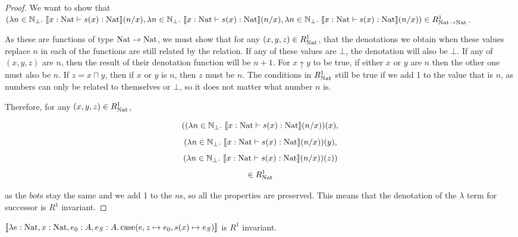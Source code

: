\begin{proof} 
We want to show 
 that  $(\lambda n \in \mathbb{N}_{\bot}. \ \llbracket x : \operatorname{Nat} \vdash s(x) : \operatorname{Nat} \rrbracket (n/x),\lambda n \in \mathbb{N}_{\bot}. \ \llbracket x : \operatorname{Nat} \vdash s(x) : \operatorname{Nat} \rrbracket (n/x), \lambda n \in \mathbb{N}_{\bot}. \ \llbracket x : \operatorname{Nat} \vdash s(x) : \operatorname{Nat} \rrbracket (n/x)) \in R_{\operatorname{Nat} \to \operatorname{Nat}}^1$. 
 
As these are functions of type $\operatorname{Nat} \to \operatorname{Nat}$, we must show that for any $(x,y,z) \in R_{\operatorname{Nat}}^1$, that the denotations we obtain when these values replace $n$ in each of the functions are still related by the relation. If any of these values are $\bot$, the denotation will also be $\bot$. If any of $(x,y,z)$ are $n$, then the result of their denotation function will be $n+1$. For $x \uparrow y$ to be true, if either $x$ or $y$ are $n$ then the other one must also be $n$. If $z = x \sqcap y$, then if $x$ or $y$ is $n$, then $z$ must be $n$. The conditions in $R_{\operatorname{Nat}}^1$ still be true if we add 1 to the value that is $n$, as  numbers can only be related to themselves or $\bot$, so it does not matter what number $n$ is.

Therefore, for any $(x,y,z) \in R_{\operatorname{Nat}}^1$,

 \[((\lambda n \in \mathbb{N}_{\bot}. \ \llbracket x : \nat \vdash s(x) : \nat \rrbracket (n/x)) (x),\]
 \[(\lambda n \in \mathbb{N}_{\bot}. \ \llbracket x : \nat \vdash s(x) : \nat \rrbracket (n/x)) (y), \]
 \[(\lambda n \in \mathbb{N}_{\bot}. \ \llbracket x : \nat \vdash s(x) : \nat \rrbracket (n/x))(z))\]
 \[ \in R_{\operatorname{Nat}}^1\]
 
as the $bot$s stay the same and we add 1 to the $n$s, so all the properties are preserved. This means that the denotation of the $\lambda$ term for successor is $R^1$ invariant.
\end{proof}

\vspace{0.5cm}

\begin{lem}
$\llbracket \lambda e : \operatorname{Nat}, x : \operatorname{Nat}, e_0 : A, e_S : A. \operatorname{case} (e, z \mapsto e_0, s(x) \mapsto e_S) \rrbracket$ is $R^1$ invariant.
\end{lem}

\vspace{0.25cm}

